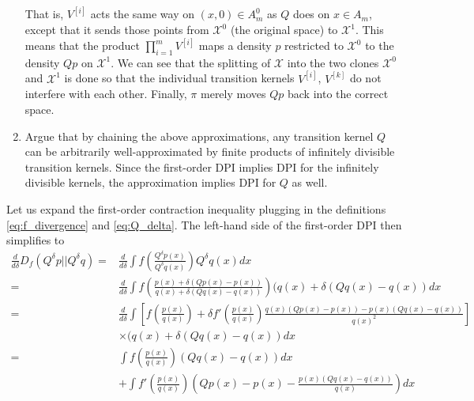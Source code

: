 \documentclass[12pt]{article}
\begin{document}
\begin{enumerate}
\[\]
That is, $V^{[i]}$ acts the same way on $(x,0) \in A_m^0$ as $Q$ does
on $x \in A_m$, except that it sends those points from $\mathcal{X}^0$
(the original space) to $\mathcal{X}^1$.  This means that the product
$\prod_{i=1}^m V^{[i]}$ maps a density $p$ restricted to
$\mathcal{X}^0$ to the density $Qp$ on $\mathcal{X}^1$.  We can see
that the splitting of $\mathcal{X}$ into the two clones
$\mathcal{X}^0$ and $\mathcal{X}^1$ is done so that the individual
transition kernels $V^{[i]}$, $V^{[k]}$ do not interfere with each
other.  Finally, $\pi$ merely moves $Qp$ back into the correct space.
\item 
Argue that by chaining the above approximations, any transition kernel
$Q$ can be arbitrarily well-approximated by finite products of
infinitely divisible transition kernels.  Since the first-order DPI
implies DPI for the infinitely divisible kernels, the approximation
implies DPI for $Q$ as well.
\end{enumerate}

Let us expand the first-order contraction inequality plugging in the
definitions \eqref{eq:f_divergence} and \eqref{eq:Q_delta}.  The left-hand side of the first-order DPI then simplifies to
\begin{align*}
\frac{d}{d\delta} D_f(Q^\delta p||Q^\delta q)
=& \frac{d}{d\delta}\int f\left(\frac{Q^\delta p(x)}{Q^\delta q(x)}\right) Q^\delta q(x) dx \\
=& \frac{d}{d\delta}\int f\left(\frac{p(x) + \delta(Qp(x) - p(x))}{q(x) + \delta(Qq(x) - q(x))}\right) (q(x) + \delta (Qq(x)-q(x)) dx \\
=& \frac{d}{d\delta}\int \left[f\left(\frac{p(x)}{q(x)}\right) + \delta f'\left(\frac{p(x)}{q(x)}\right) \frac{q(x)(Qp(x) - p(x)) - p(x) (Qq(x) - q(x))}{q(x)^2}\right]\\
&\times (q(x) + \delta (Qq(x)-q(x)) dx\\
=& \int f\left(\frac{p(x)}{q(x)}\right) (Qq(x)-q(x)) dx \\
&+ \int f'\left(\frac{p(x)}{q(x)}\right) \left(Qp(x) - p(x) - \frac{p(x) (Qq(x) - q(x))}{q(x)}\right)  dx
\end{align*}
\end{document}
